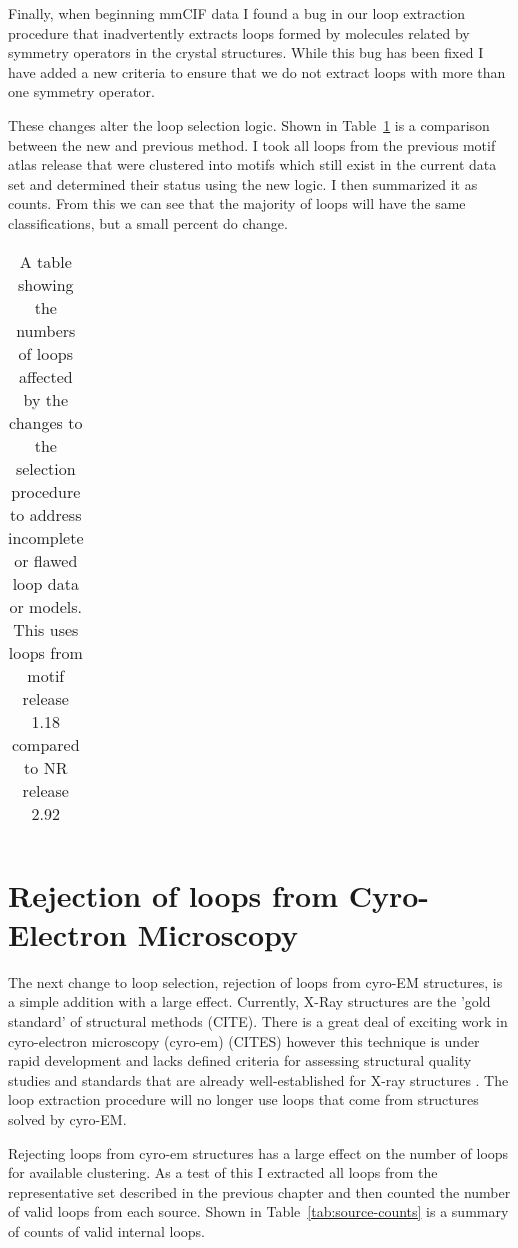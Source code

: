 Finally, when beginning mmCIF data I found a bug in our loop extraction
procedure that inadvertently extracts loops formed by molecules related by
symmetry operators in the crystal structures. While this bug has been fixed I
have added a new criteria to ensure that we do not extract loops with more than
one symmetry operator. 

These changes alter the loop selection logic. Shown in
Table~\ref{tab:loop-quality-changes} is a comparison between the new and
previous method. I took all loops from the previous motif atlas release that
were clustered into motifs which still exist in the current data set and
determined their status using the new logic. I then summarized it as counts.
From this we can see that the majority of loops will have the same
classifications, but a small percent do change.

\begin{table}
  \begin{tabular}{lr}
    \toprule
    \midrule
    \bottomrule
  \end{tabular}
  \caption{A table showing the numbers of loops affected by the changes to the
    selection procedure to address incomplete or flawed loop data or models.
  This uses loops from motif release 1.18 compared to NR release 2.92}
  \label{tab:loop-quality-changes}
\end{table}

\section{Rejection of loops from Cyro-Electron Microscopy}

The next change to loop selection, rejection of loops from cyro-EM structures,
is a simple addition with a large effect. Currently, X-Ray structures are the
'gold standard' of structural methods (CITE). There is a great deal of exciting
work in cyro-electron microscopy (cyro-em) (CITES) however this technique is
under rapid development and lacks defined criteria for assessing structural
quality studies and standards that are already well-established for X-ray
structures \cite{Henderson2012a}. The loop extraction procedure will no longer
use loops that come from structures solved by cyro-EM. 

Rejecting loops from cyro-em structures has a large effect on the number of
loops for available clustering. As a test of this I extracted all loops from the
representative set described in the previous chapter and then counted the number
of valid loops from each source.  Shown in Table~\ref{tab:source-counts} is a
summary of counts of valid internal loops. 

